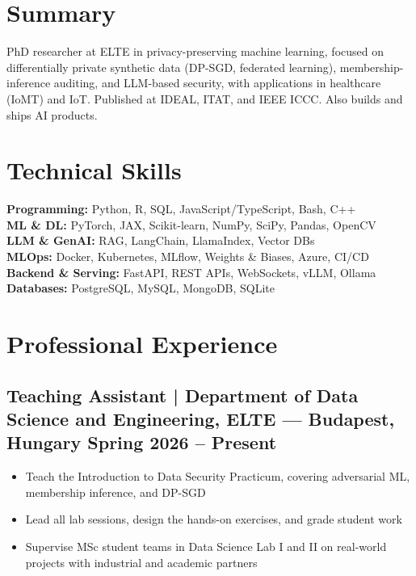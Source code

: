 \documentclass[10pt]{article}
\newcommand{\skills}[1]{\textbf{#1}}
\begin{document}
\linespread{0.95}\selectfont
\thispagestyle{first_page}

\noindent
\begin{minipage}[t]{0.47\textwidth}
\section{Summary}
\raggedright
PhD researcher at ELTE in privacy-preserving machine learning, focused on differentially private synthetic data (DP-SGD, federated learning), membership-inference auditing, and LLM-based security, with applications in healthcare (IoMT) and IoT. Published at IDEAL, ITAT, and IEEE ICCC. Also builds and ships AI products.
\end{minipage}%
\hfill
\begin{minipage}[t]{0.51\textwidth}
\section{Technical Skills}
\skills{Programming:} Python, R, SQL, JavaScript/TypeScript, Bash, C++ \\
\skills{ML \& DL:} PyTorch, JAX, Scikit-learn, NumPy, SciPy, Pandas, OpenCV \\
\skills{LLM \& GenAI:} RAG, LangChain, LlamaIndex, Vector DBs \\
\skills{MLOps:} Docker, Kubernetes, MLflow, Weights \& Biases, Azure, CI/CD \\
\skills{Backend \& Serving:} FastAPI, REST APIs, WebSockets, vLLM, Ollama \\
\skills{Databases:} PostgreSQL, MySQL, MongoDB, SQLite
\end{minipage}

\section{Professional Experience}

\subsection{Teaching Assistant | \mdseries Department of Data Science and Engineering, ELTE --- Budapest, Hungary \hfill \bfseries Spring 2026 -- Present}
\begin{itemize}
    \item Teach the Introduction to Data Security Practicum, covering adversarial ML, membership inference, and DP-SGD \href{https://elte-dsed.github.io/Intro-Data-Security/}{}
    \item Lead all lab sessions, design the hands-on exercises, and grade student work
    \item Supervise MSc student teams in Data Science Lab I and II on real-world projects with industrial and academic partners
\end{itemize}
\end{document}
